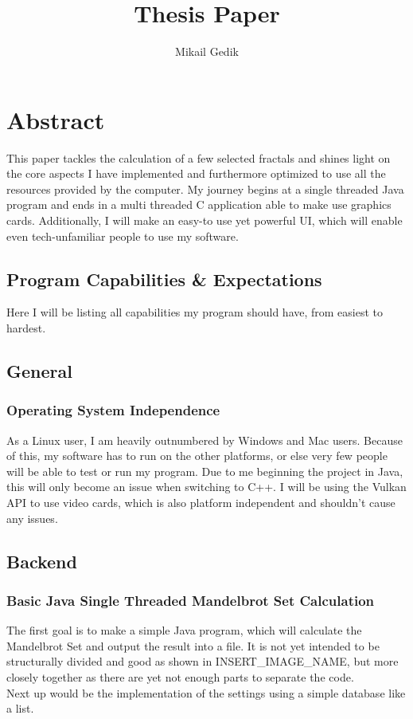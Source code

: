 \documentclass[10pt,a4paper,titlepage]{article}
\author{Mikail Gedik}
\title{Thesis Paper}
\begin{document}
	\maketitle
	\tableofcontents
	\clearpage
	\section{Abstract}
	This paper tackles the calculation of a few selected fractals and shines light on the core aspects I have implemented and furthermore optimized to use all the resources provided by the computer. My journey begins at a single threaded Java program and ends in a multi threaded C application able to make use graphics cards. Additionally, I will make an easy-to use yet powerful UI, which will enable even tech-unfamiliar people to use my software.
	\subsection{Program Capabilities \& Expectations}
	Here I will be listing all capabilities my program should have, from easiest to hardest.
	\subsection{General}
	\subsubsection{Operating System Independence}
	As a Linux user, I am heavily outnumbered by Windows and Mac users. Because of this, my software has to run on the other platforms, or else very few people will be able to test or run my program. Due to me beginning the project in Java, this will only become an issue when switching to C++. I will be using the Vulkan API to use video cards, which is also platform independent and shouldn't cause any issues.
	\subsection{Backend}
	\subsubsection{Basic Java Single Threaded Mandelbrot Set Calculation}
	The first goal is to make a simple Java program, which will calculate the Mandelbrot Set and output the result into a file. It is not yet intended to be structurally divided and good as shown in INSERT\_IMAGE\_NAME, but more closely together as there are yet not enough parts to separate the code.\\
	Next up would be the implementation of the settings using a simple database like a list.
\end{document}
